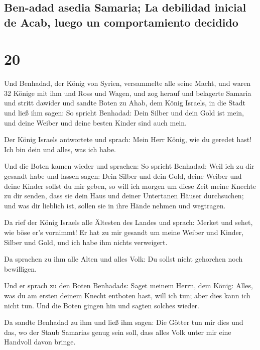 \hypertarget{ben-adad-asedia-samaria-la-debilidad-inicial-de-acab-luego-un-comportamiento-decidido}{%
\subsection{Ben-adad asedia Samaria; La debilidad inicial de Acab, luego
un comportamiento
decidido}\label{ben-adad-asedia-samaria-la-debilidad-inicial-de-acab-luego-un-comportamiento-decidido}}

\hypertarget{section-19}{%
\section{20}\label{section-19}}

 Und Benhadad, der König von Syrien, versammelte alle
seine Macht, und waren 32 Könige mit ihm und Ross und Wagen, und zog
herauf und belagerte Samaria und stritt dawider  und
sandte Boten zu Ahab, dem König Israels, in die Stadt  und
ließ ihm sagen: So spricht Benhadad: Dein Silber und dein Gold ist mein,
und deine Weiber und deine besten Kinder sind auch mein.

 Der König Israels antwortete und sprach: Mein Herr König,
wie du geredet hast! Ich bin dein und alles, was ich habe.

 Und die Boten kamen wieder und sprachen: So spricht
Benhadad: Weil ich zu dir gesandt habe und lassen sagen: Dein Silber und
dein Gold, deine Weiber und deine Kinder sollst du mir geben,
 so will ich morgen um diese Zeit meine Knechte zu dir
senden, dass sie dein Haus und deiner Untertanen Häuser durchsuchen; und
was dir lieblich ist, sollen sie in ihre Hände nehmen und wegtragen.

 Da rief der König Israels alle Ältesten des Landes und
sprach: Merket und sehet, wie böse er's vornimmt! Er hat zu mir gesandt
um meine Weiber und Kinder, Silber und Gold, und ich habe ihm nichts
verweigert.

 Da sprachen zu ihm alle Alten und alles Volk: Du sollst
nicht gehorchen noch bewilligen.

 Und er sprach zu den Boten Benhadads: Saget meinem Herrn,
dem König: Alles, was du am ersten deinem Knecht entboten hast, will ich
tun; aber dies kann ich nicht tun. Und die Boten gingen hin und sagten
solches wieder.

 Da sandte Benhadad zu ihm und ließ ihm sagen: Die Götter
tun mir dies und das, wo der Staub Samarias genug sein soll, dass alles
Volk unter mir eine Handvoll davon bringe.


